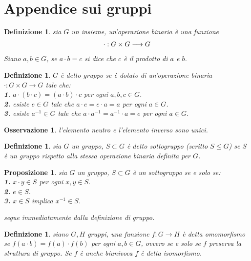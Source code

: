 \documentclass[oneside, 11pt]{amsbook}
\makeatletter
\newcommand{\0}{{(0)}}
\newcommand{\3}{{(3)}}
\theoremstyle{colonplain}
\newtheorem{prop}[thm]{Proposizione}
\theoremstyle{colondefinition}
\newtheorem{defn}[thm]{Definizione}
\theoremstyle{colonremark}
\newtheorem{rmk}[thm]{Osservazione}
\numberwithin{equation}{chapter}
\renewcommand{\proofname}{Dimostrazione}
\renewenvironment{proof}[1][\proofname]{\par
  \pushQED{\qed}%
  \normalfont \topsep6\p@\@plus6\p@\relax
  \trivlist
  \item[\hskip\labelsep\bfseries #1:]\ignorespaces
}{%
  \popQED\endtrivlist\@endpefalse
}
\makeatother
\begin{document}
\section{Appendice sui gruppi}
\begin{defn}
sia $G$ un insieme, un'operazione binaria è una funzione
\begin{align}
    \cdot : G \times G \longrightarrow G \notag
\end{align}
Siano $a, b \in G$, se $a \cdot b = c$ si dice che $c$ è il \textit{prodotto} di $a$ e $b$.
\end{defn}
\begin{defn}
$G$ è detto \textit{gruppo} se è dotato di un'operazione binaria \\ $\cdot : G \times G \longrightarrow G$ tale che: \\
\textbf{1.} $a \cdot (b \cdot c) = (a \cdot b) \cdot c$ per ogni $a, b, c \in G$. \\
\textbf{2.} esiste $e \in G$ tale che $a \cdot e = e \cdot a = a$ per ogni $a \in G$. \\
\textbf{3.} esiste $a^{-1} \in G$ tale che $a \cdot a^{-1} = a^{-1} \cdot a = e$ per ogni $a \in G$.
\end{defn}
\begin{rmk}
l'elemento neutro e l'elemento inverso sono unici.
\end{rmk}
\begin{defn}
sia $G$ un gruppo, $S \subset G$ è detto \textit{sottogruppo} (scritto $S \leq G$) se $S$ è un gruppo rispetto alla stessa operazione binaria definita per $G$.
\end{defn}
\begin{prop}
sia $G$ un gruppo, $S \subset G$ è un sottogruppo se e solo se: \\
\textbf{1.} $x \cdot y \in S$ per ogni $x, y \in S$. \\
\textbf{2.} $e \in S$. \\
\textbf{3.} $x \in S$ implica $x^{-1} \in S$.
\begin{proof}
segue immediatamente dalla definizione di gruppo.
\end{proof}
\end{prop}
\begin{defn}
siano $G, H$ gruppi, una funzione $f : G \longrightarrow H$ è detta \textit{omomorfismo} se $f(a \cdot b) = f(a) \cdot f(b)$ per ogni $a, b \in G$, ovvero se e solo se $f$ \textit{preserva la struttura di gruppo}. Se $f$ è anche biunivoca $f$ è detta \textit{isomorfismo}.
\end{defn}
\end{document}
